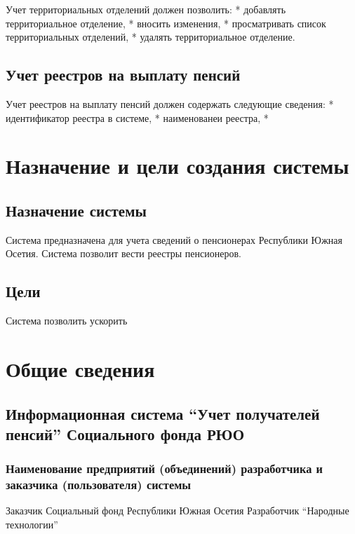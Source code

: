 \documentclass[letterpaper,10pt,english]{sphinxmanual}
\begin{document}
\sphinxAtStartPar
Учет территориальных отделений должен позволить:
* добавлять территориальное отделение,
* вносить изменения,
* просматривать список территориальных отделений,
* удалять территориальное отделение.


\section{Учет реестров на выплату пенсий}
\label{\detokenize{term:id5}}
\sphinxAtStartPar
Учет реестров на выплату пенсий должен содержать следующие сведения:
* идентификатор реестра в системе,
* наименованеи реестра,
*

\sphinxstepscope


\chapter{Назначение и цели создания системы}
\label{\detokenize{goals:id1}}\label{\detokenize{goals::doc}}

\section{Назначение системы}
\label{\detokenize{goals:id2}}
\sphinxAtStartPar
Система предназначена для учета сведений о пенсионерах Республики Южная Осетия.
Система позволит вести реестры пенсионеров.


\section{Цели}
\label{\detokenize{goals:id3}}
\sphinxAtStartPar
Система позволить ускорить

\sphinxstepscope


\chapter{Общие сведения}
\label{\detokenize{common:id1}}\label{\detokenize{common::doc}}

\section{Информационная система “Учет получателей пенсий” Социального фонда РЮО}
\label{\detokenize{common:id2}}

\subsection{Наименование предприятий (объединений) разработчика и заказчика (пользователя) системы}
\label{\detokenize{common:id3}}
\sphinxAtStartPar
Заказчик \sphinxhyphen{} Социальный фонд Республики Южная Осетия
Разработчик \sphinxhyphen{} “Народные технологии”



\renewcommand{\indexname}{Index}
\printindex
\end{document}
